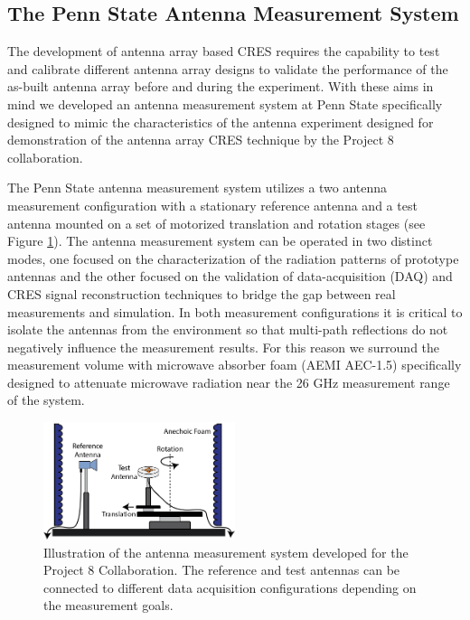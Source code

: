 \subsection{The Penn State Antenna Measurement System}
\label{sec:antenna_measurement_system}

The development of antenna array based CRES requires the capability to test and calibrate different antenna array designs to validate the performance of the as-built antenna array before and during the experiment. With these aims in mind we developed an antenna measurement system at Penn State specifically designed to mimic the characteristics of the antenna experiment designed for demonstration of the antenna array CRES technique by the Project 8 collaboration. 

The Penn State antenna measurement system utilizes a two antenna measurement configuration with a stationary reference antenna and a test antenna mounted on a set of motorized translation and rotation stages (see Figure \ref{fig:meas-sys-cartoon}). The antenna measurement system can be operated in two distinct modes, one focused on the characterization of the radiation patterns of prototype antennas and the other focused on the validation of data-acquisition (DAQ) and CRES signal reconstruction techniques to bridge the gap between real measurements and simulation. In both measurement configurations it is critical to isolate the antennas from the environment so that multi-path reflections do not negatively influence the measurement results. For this reason we surround the measurement volume with microwave absorber foam (AEMI AEC-1.5) specifically designed to attenuate microwave radiation near the 26 GHz measurement range of the system.

\begin{figure}[htbp]
    \centering
    \includegraphics[width=0.5\textwidth]{figs/Chapter-5/230409_measurement_system_figure_cartoon.png}
    \caption{Illustration of the antenna measurement system developed for the Project 8 Collaboration. The reference and test antennas can be connected to different data acquisition configurations depending on the measurement goals.}
    \label{fig:meas-sys-cartoon}
\end{figure}

